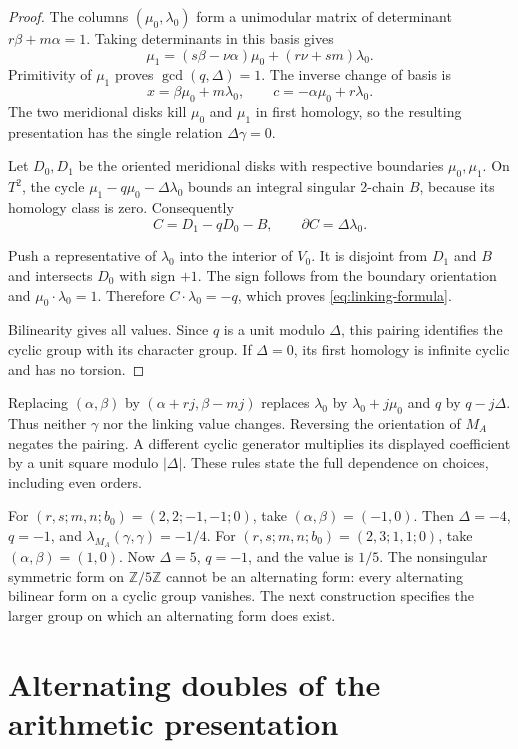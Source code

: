 \documentclass[11pt]{article}
\numberwithin{equation}{section}
\begin{document}
\begin{proof}
The columns $(\mu_0,\lambda_0)$ form a unimodular matrix of determinant
$r\beta+m\alpha=1$.  Taking determinants in this basis gives
\[
 \mu_1=(s\beta-\nu\alpha)\mu_0+(r\nu+sm)\lambda_0.
\]
Primitivity of $\mu_1$ proves $\gcd(q,\Delta)=1$.
The inverse change of basis is
\[
               x=\beta\mu_0+m\lambda_0,\qquad
               c=-\alpha\mu_0+r\lambda_0.
\]
The two meridional disks kill $\mu_0$ and $\mu_1$ in first homology,
so the resulting presentation has the single relation $\Delta\gamma=0$.

Let $D_0,D_1$ be the oriented meridional disks with respective
boundaries $\mu_0,\mu_1$.  On $T^2$, the cycle
$\mu_1-q\mu_0-\Delta\lambda_0$ bounds an integral singular
2-chain $B$, because its homology class is zero.  Consequently
\[
                   C=D_1-qD_0-B,\qquad
                   \partial C=\Delta\lambda_0.
\]

Push a representative of $\lambda_0$ into the interior of $V_0$.
It is disjoint from $D_1$ and $B$ and intersects $D_0$ with sign $+1$.
The sign follows from the boundary orientation and
$\mu_0\cdot\lambda_0=1$.  Therefore $C\cdot\lambda_0=-q$,
which proves \eqref{eq:linking-formula}.

Bilinearity gives all values.
Since $q$ is a unit modulo $\Delta$, this pairing identifies the cyclic
group with its character group.  If $\Delta=0$, its first homology
is infinite cyclic and has no torsion.
\end{proof}

Replacing $(\alpha,\beta)$ by $(\alpha+rj,\beta-mj)$ replaces
$\lambda_0$ by $\lambda_0+j\mu_0$ and $q$ by $q-j\Delta$.
Thus neither $\gamma$ nor the linking value changes.
Reversing the orientation of $M_A$ negates the pairing.
A different cyclic generator multiplies its displayed coefficient by a
unit square modulo $|\Delta|$.
These rules state the full dependence on choices, including even orders.

For $(r,s;m,n;b_0)=(2,2;-1,-1;0)$, take
$(\alpha,\beta)=(-1,0)$.  Then $\Delta=-4$, $q=-1$, and
$\lambda_{M_A}(\gamma,\gamma)=-1/4$.
For $(r,s;m,n;b_0)=(2,3;1,1;0)$, take $(\alpha,\beta)=(1,0)$.
Now $\Delta=5$, $q=-1$, and the value is $1/5$.
The nonsingular symmetric form on $\mathbb Z/5\mathbb Z$ cannot
be an alternating form: every alternating bilinear form on a cyclic
group vanishes.  The next construction specifies the larger group
on which an alternating form does exist.

\section{Alternating doubles of the arithmetic presentation}
\end{document}
